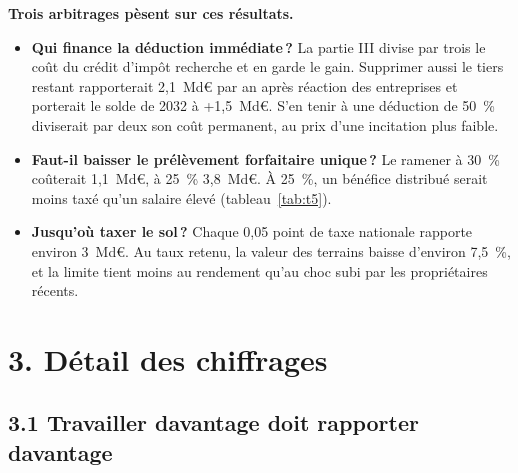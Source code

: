 \textbf{Trois arbitrages pèsent sur ces résultats.}
\begin{itemize}[leftmargin=12pt,itemsep=1pt,topsep=1pt]
\item \textbf{Qui finance la déduction immédiate\,?} La partie III divise par trois le coût du crédit d'impôt recherche et
en garde le gain. Supprimer aussi le tiers restant rapporterait 2,1~Md€ par an après réaction des entreprises et
porterait le solde de 2032 à +1,5~Md€. S'en tenir à une déduction de 50~\% diviserait par deux son coût permanent, au
prix d'une incitation plus faible.
\item \textbf{Faut-il baisser le prélèvement forfaitaire unique\,?} Le ramener à 30~\% coûterait 1,1~Md€, à 25~\% 3,8~Md€.
À 25~\%, un bénéfice distribué serait moins taxé qu'un salaire élevé (tableau~\ref{tab:t5}).
\item \textbf{Jusqu'où taxer le sol\,?} Chaque 0,05 point de taxe nationale rapporte environ 3~Md€. Au taux retenu, la
valeur des terrains baisse d'environ 7,5~\%, et la limite tient moins au rendement qu'au choc subi par les propriétaires
récents.
\end{itemize}

\section{3. Détail des chiffrages}

\subsection{3.1 Travailler davantage doit rapporter davantage}














